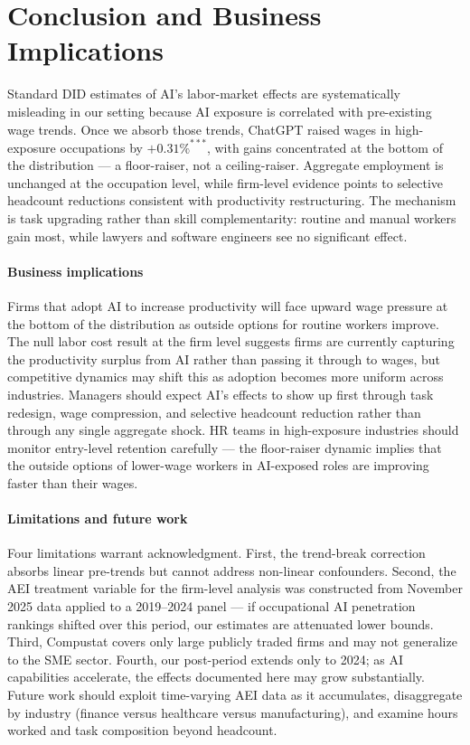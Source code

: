 \documentclass[12pt,a4paper]{article}
\begin{document}
\section{Conclusion and Business Implications}

Standard DID estimates of AI's labor-market effects are systematically misleading in our setting because AI exposure is correlated with pre-existing wage trends. Once we absorb those trends, ChatGPT raised wages in high-exposure occupations by $+0.31\%^{***}$, with gains concentrated at the bottom of the distribution — a floor-raiser, not a ceiling-raiser. Aggregate employment is unchanged at the occupation level, while firm-level evidence points to selective headcount reductions consistent with productivity restructuring. The mechanism is task upgrading rather than skill complementarity: routine and manual workers gain most, while lawyers and software engineers see no significant effect.

\paragraph{Business implications} Firms that adopt AI to increase productivity will face upward wage pressure at the bottom of the distribution as outside options for routine workers improve. The null labor cost result at the firm level suggests firms are currently capturing the productivity surplus from AI rather than passing it through to wages, but competitive dynamics may shift this as adoption becomes more uniform across industries. Managers should expect AI's effects to show up first through task redesign, wage compression, and selective headcount reduction rather than through any single aggregate shock. HR teams in high-exposure industries should monitor entry-level retention carefully — the floor-raiser dynamic implies that the outside options of lower-wage workers in AI-exposed roles are improving faster than their wages.

\paragraph{Limitations and future work} Four limitations warrant acknowledgment. First, the trend-break correction absorbs linear pre-trends but cannot address non-linear confounders. Second, the AEI treatment variable for the firm-level analysis was constructed from November 2025 data applied to a 2019--2024 panel — if occupational AI penetration rankings shifted over this period, our estimates are attenuated lower bounds. Third, Compustat covers only large publicly traded firms and may not generalize to the SME sector. Fourth, our post-period extends only to 2024; as AI capabilities accelerate, the effects documented here may grow substantially. Future work should exploit time-varying AEI data as it accumulates, disaggregate by industry (finance versus healthcare versus manufacturing), and examine hours worked and task composition beyond headcount.
\end{document}
